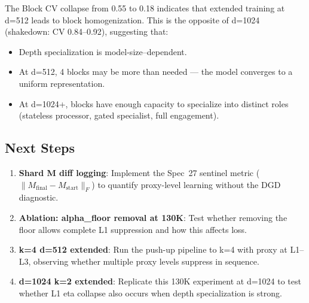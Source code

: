 \documentclass[11pt,a4paper]{article}
\begin{document}
The Block CV collapse from 0.55 to 0.18 indicates that extended training at d=512 leads to block
homogenization. This is the opposite of d=1024 (shakedown: CV 0.84--0.92), suggesting that:
\begin{itemize}
    \item Depth specialization is model-size--dependent.
    \item At d=512, 4 blocks may be more than needed --- the model converges to a uniform representation.
    \item At d=1024+, blocks have enough capacity to specialize into distinct roles (stateless processor, gated specialist, full engagement).
\end{itemize}

\subsection{Next Steps}

\begin{enumerate}
    \item \textbf{Shard M diff logging}: Implement the Spec~27 sentinel metric ($\|M_{\mathrm{final}} - M_{\mathrm{start}}\|_F$) to quantify proxy-level learning without the DGD diagnostic.
    \item \textbf{Ablation: alpha\_floor removal at 130K}: Test whether removing the floor allows complete L1 suppression and how this affects loss.
    \item \textbf{k=4 d=512 extended}: Run the push-up pipeline to k=4 with proxy at L1--L3, observing whether multiple proxy levels suppress in sequence.
    \item \textbf{d=1024 k=2 extended}: Replicate this 130K experiment at d=1024 to test whether L1 eta collapse also occurs when depth specialization is strong.
\end{enumerate}
\end{document}
